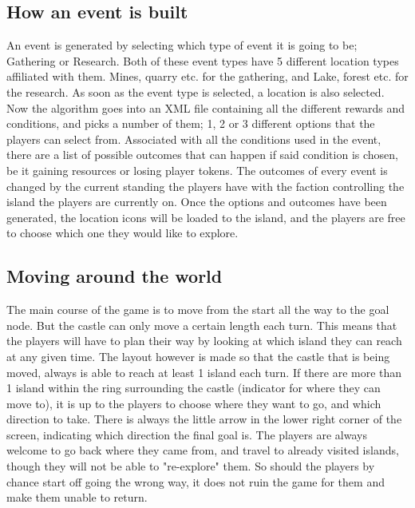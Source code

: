 \subsection{How an event is built}
An event is generated by selecting which type of event it is going to be; Gathering or Research. Both of these event types have 5 different location types affiliated with them. Mines, quarry etc. for the gathering, and Lake, forest etc. for the research. As soon as the event type is selected, a location is also selected. Now the algorithm goes into an XML file containing all the different rewards and conditions, and picks a number of them; 1, 2 or 3 different options that the players can select from. Associated with all the conditions used in the event, there are a list of possible outcomes that can happen if said condition is chosen, be it gaining resources or losing player tokens. The outcomes of every event is changed by the current standing the players have with the faction controlling the island the players are currently on. 
Once the options and outcomes have been generated, the location icons will be loaded to the island, and the players are free to choose which one they would like to explore.

\subsection{Moving around the world}
The main course of the game is to move from the start all the way to the goal node. But the castle can only move a certain length each turn. This means that the players will have to plan their way by looking at which island they can reach at any given time. The layout however is made so that the castle that is being moved, always is able to reach at least 1 island each turn. If there are more than 1 island within the ring surrounding the castle (indicator for where they can move to), it is up to the players to choose where they want to go, and which direction to take. There is always the little arrow in the lower right corner of the screen, indicating which direction the final goal is. The players are always welcome to go back where they came from, and travel to already visited islands, though they will not be able to "re-explore" them. So should the players by chance start off going the wrong way, it does not ruin the game for them and make them unable to return.

